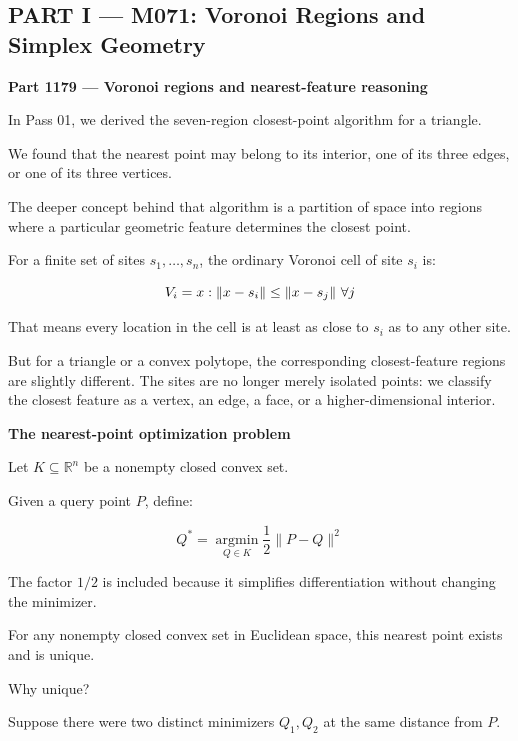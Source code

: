 \subsection{PART I --- M071: Voronoi Regions and Simplex Geometry}\label{04-visual-computing-ii-ch022-part-i-m071-voronoi-regions-and-simplex-geometry}

\hypertarget{04-visual-computing-ii-ch022-part-i-m071-voronoi-regions-and-simplex-geometry}{}

\textbf{Part 1179 --- Voronoi regions and nearest-feature reasoning}

In Pass 01, we derived the seven-region closest-point algorithm for a triangle.

We found that the nearest point may belong to its interior, one of its three edges, or one of its three vertices.

The deeper concept behind that algorithm is a partition of space into regions where a particular geometric feature determines the closest point.

For a finite set of sites \(s_1,\ldots,s_n\), the ordinary Voronoi cell of site \(s_i\) is:

\[
V_i=\\{x:\|x-s_i\|\le\|x-s_j\|\ \forall j\\}
\]

That means every location in the cell is at least as close to \(s_i\) as to any other site.

But for a triangle or a convex polytope, the corresponding closest-feature regions are slightly different. The sites are no longer merely isolated points: we classify the closest feature as a vertex, an edge, a face, or a higher-dimensional interior.

\textbf{The nearest-point optimization problem}

Let \(K\subseteq\mathbb R^n\) be a nonempty closed convex set.

Given a query point \(P\), define:

\[
\boxed{ Q^*=\underset{Q\in K}{\operatorname{argmin}}\frac12\|P-Q\|^2 }
\]

The factor \(1/2\) is included because it simplifies differentiation without changing the minimizer.

For any nonempty closed convex set in Euclidean space, this nearest point exists and is unique.

Why unique?

Suppose there were two distinct minimizers \(Q_1,Q_2\) at the same distance from \(P\).

